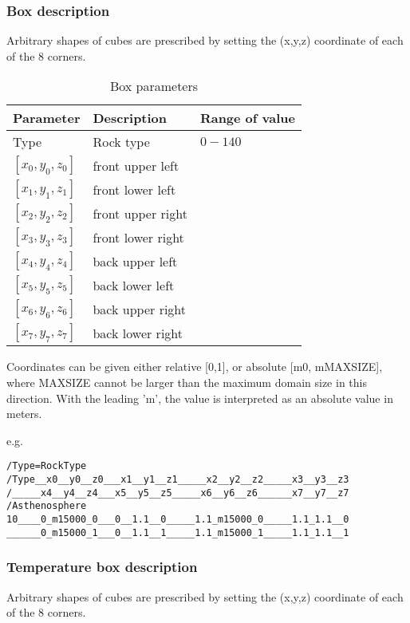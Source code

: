 \begin{table}[H]
\subsubsection{Box description}
Arbitrary shapes of cubes are prescribed by setting the (x,y,z) coordinate of each of the 8 corners.

\begin{table}[H]
\centering
\begin{tabular}{l l l}
\toprule
Parameter		& Description			& Range of value \\
\midrule
Type			& Rock type				& $0-140$\\
$[x_0,y_0,z_0]$ & front upper left\\ 
$[x_1,y_1,z_1]$ & front lower left \\  
$[x_2,y_2,z_2]$ & front upper right \\ 
$[x_3,y_3,z_3]$ & front lower right \\ 
$[x_4,y_4,z_4]$ & back upper left \\  
$[x_5,y_5,z_5]$ & back lower left \\ 
$[x_6,y_6,z_6]$ & back upper right \\  
$[x_7,y_7,z_7]$ & back lower right \\ 
\bottomrule
\end{tabular}
\caption{Box parameters}
\label{tbl:box_parameters}
\end{table}

Coordinates can be given either relative [0,1], or absolute [m0, mMAXSIZE], where MAXSIZE cannot be larger than the maximum domain size in this direction. With the leading 'm', the value is interpreted as an absolute value in meters.

e.g.
\begin{lstlisting}
/Type=RockType
/Type__x0__y0__z0___x1__y1__z1_____x2__y2__z2_____x3__y3__z3
/_____x4__y4__z4___x5__y5__z5_____x6__y6__z6______x7__y7__z7
/Asthenosphere
10____0_m15000_0___0__1.1__0_____1.1_m15000_0_____1.1_1.1__0
______0_m15000_1___0__1.1__1_____1.1_m15000_1_____1.1_1.1__1
\end{lstlisting}

\subsubsection{Temperature box description}
Arbitrary shapes of cubes are prescribed by setting the (x,y,z) coordinate of each of the 8 corners.


\end{table}
